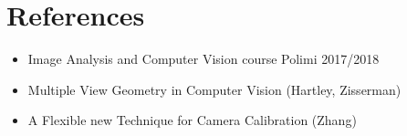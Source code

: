 \documentclass[11pt, oneside]{article}   	%
\begin{document}
\pagebreak

 \section{References}
 \begin{itemize}
 \item Image Analysis and Computer Vision course Polimi 2017/2018
 \item Multiple View Geometry in Computer Vision (Hartley, Zisserman)
 \item A Flexible new Technique for Camera Calibration (Zhang)
 \end{itemize}
\end{document}
